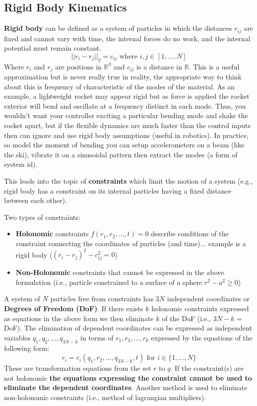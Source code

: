 \documentclass{article}
\begin{document}
\subsection{Rigid Body Kinematics}

\textbf{Rigid body} can be defined as a system of particles in which the distances $r_{ij}$ are fixed and cannot vary with time, the internal forces do no work, and the internal potential must remain constant.
\begin{equation}
    ||r_i - r_j||_2 = c_{ij} \text{ where } i, j \in [1, ..., N]
\end{equation}
Where $r_i$ and $r_j$ are positions in $\mathbb{R}^3$ and $c_{ij}$ is a distance in $\mathbb{R}$. This is a useful approximation but is never really true in reality, the appropriate way to think about this is frequency of characteristic of the modes of the material. As an example, a lightweight rocket may appear rigid but as force is applied the rocket exterior will bend and oscillate at a frequency distinct in each mode. Thus, you wouldn't want your controller exciting a particular bending mode and shake the rocket apart, but if the flexible dynamics are much faster than the control inputs then can ignore and use rigid body assumptions (useful in robotics). In practice, so model the moment of bending you can setup accelerometers on a beam (like the ski), vibrate it on a sinusoidal pattern then extract the modes (a form of system id).

This leads into the topic of \textbf{constraints} which limit the motion of a system (e.g., rigid body has a constraint on its internal particles having a fixed distance between each other).

Two types of constraints:
\begin{itemize}
    \item \textbf{Holonomic} constraints $f(r_1, r_2, ..., t) = 0$ describe conditions of the constraint connecting the coordinates of particles (and time)... example is a rigid body ($(r_i - r_j)^2 - c_{ij}^2 = 0$)
    \item \textbf{Non-Holonomic} constraints that cannot be expressed in the above formulation (i.e., particle constrained to a surface of a sphere $r^2 - a^2 \ge 0$)
\end{itemize}

A system of $N$ particles free from constraints has $3N$ independent coordinates or \textbf{Degrees of Freedom (DoF)}. If there exists $k$ holonomic constraints expressed as equations in the above form we then eliminate $k$ of the DoF (i.e., $3N - k$ = DoF). The elimination of dependent coordinates can be expressed as independent variables $q_1, q_2, ..., q_{3N-k}$ in terms of $r_1, r_2, ..., r_k$ expressed by the equations of the following form:
\begin{equation}
    r_i = r_i(q_1, r_2, ..., q_{3N-k}, t) \text{ for } i \in \{1, ..., N\}
\end{equation}
These are transformation equations from the set $r$ to $q$. If the constraint(s) are not holonomic \textbf{the equations expressing the constraint cannot be used to eliminate the dependent coordinates}. Another method is used to eliminate non-holonomic constraints (i.e., method of lagrangian multipliers).
\end{document}
